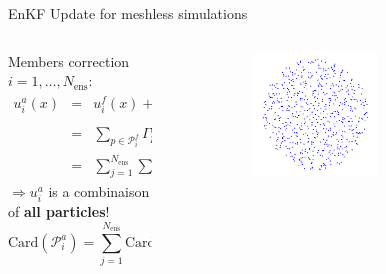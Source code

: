\documentclass[aspectratio=169]{beamer} %
\begin{document}
\begin{frame}{EnKF Update for meshless simulations}
    \begin{columns}[t]
        \begin{column}{0.7\textwidth}
            Members correction $i = 1, \dots, N_{\text{ens}}$: \\
            \vspace{-0.50cm}
            \begin{eqnarray*}
                u_i^a(x) &=& u^f_i(x) + \sum_{j=1}^{N_{\text{ens}}} F_{ij}~u^f_j(x), \\
                &=& \sum_{p \in \mathcal{P}^f_i} \Gamma^f_p \phi_h(x - x_p) + \sum_{j=1}^{N_{\text{ens}}} F_{ij} \sum_{{p'} \in \mathcal{P}_j^f} \Gamma^f_{p'} \phi_h(x - x_{p'}), \\
                &=& \sum_{j=1}^{N_{\text{ens}}} \sum_{ p \in \mathcal{P}^f_i} \Gamma^a_p \phi_h (x - x_p)
            \end{eqnarray*}
            \vspace{-0.10cm}
            $\Rightarrow u_i^a$ is a combinaison of \textbf{all particles}! \\
            \vspace{-0.10cm}
            \begin{equation*}\text{Card}(\mathcal P^a_i) = \sum_{j=1}^{N_{\text{ens}}}\text{Card}(\mathcal P^f_j)
            \end{equation*}
        \end{column}
        \begin{column}{0.3\textwidth}
            \vspace{-1cm}
            \begin{figure}
                \centering
                \begin{subfigure}{\textwidth}
                    \centering
                    \includegraphics[width=0.7\textwidth]{../../conference/images/memb_particles.pdf}

\end{subfigure}
\end{figure}
\end{column}
\end{columns}
\end{frame}
\end{document}

